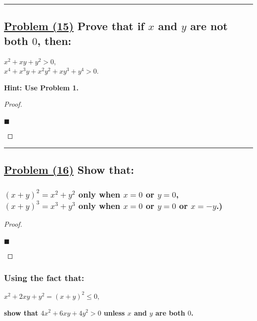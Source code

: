 \documentclass[letterpaper, 10 pt, conference]{ieeeconf}  %
\begin{document}
\noindent\rule{8cm}{0.4pt}
\subsection{\textbf{\underline{Problem (15)} Prove that if $x$ and $y$ are not both $0$, then:}}

\begin{center}
    $x^2 + xy +y^2 > 0$, \\
    $x^4 + x^3y + x^2y^2 + xy^3 + y^4 > 0$. 
\end{center}

\textbf{Hint: Use Problem 1.}

\begin{proof}
\begin{align}
    
\end{align}
\begin{flushright}
$\blacksquare$
\end{flushright}
\end{proof}

\noindent\rule{8cm}{0.4pt}
\subsection{\textbf{\underline{Problem (16)} Show that:}}

\subsubsection{\textbf{$(x + y)^2 = x^2 + y^2$ only when $x = 0$ or $y = 0$, \\ $(x + y)^3 = x^3 + y^3$ only when $x = 0$ or $y = 0$ or $x = -y$.)}}

\begin{proof}
\begin{align}
    
\end{align}
\begin{flushright}
$\blacksquare$
\end{flushright}
\end{proof}

\subsubsection{\textbf{Using the fact that:}}
\begin{center}
    $x^2 + 2xy + y^2 = (x + y)^2 \leq 0$, 
\end{center}
\textbf{show that $4x^2 + 6xy + 4y^2 > 0$ unless $x$ and $y$ are both $0$.}
\end{document}
